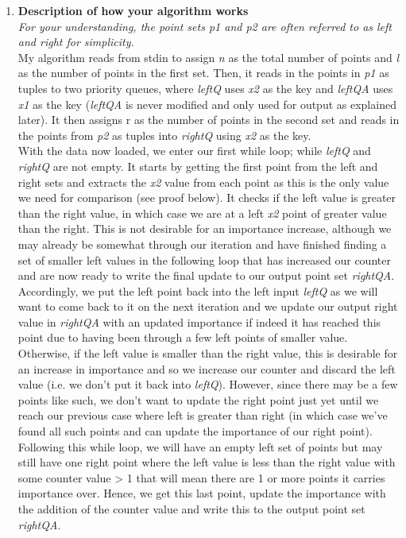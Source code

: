 \documentclass[11pt, oneside]{article}   	%
\begin{document}
\begin{enumerate}
\begin{enumerate}
		\begin{enumerate}
			\item \textbf{Description of how your algorithm works}\\
			\textit{For your understanding, the point sets p1 and p2 are often referred to as left and right for simplicity.}\\
			My algorithm reads from stdin to assign \textit{n} as the total number of points and \textit{l} as the number of points in the first set. Then, it reads in the points in \textit{p1} as tuples to two priority queues, where \textit{leftQ} uses \textit{x2} as the key and \textit{leftQA} uses \textit{x1} as the key (\textit{leftQA} is never modified and only used for output as explained later). It then assigns r as the number of points in the second set and reads in the points from \textit{p2} as tuples into \textit{rightQ} using \textit{x2} as the key.\\
			With the data now loaded, we enter our first while loop; while \textit{leftQ} and \textit{rightQ} are not empty. It starts by getting the first point from the left and right sets and extracts the \textit{x2} value from each point as this is the only value we need for comparison (see proof below). It checks if the left value is greater than the right value, in which case we are at a left \textit{x2} point of greater value than the right. This is not desirable for an importance increase, although we may already be somewhat through our iteration and have finished finding a set of smaller left values in the following loop that has increased our counter and are now ready to write the final update to our output point set \textit{rightQA}. Accordingly, we put the left point back into the left input \textit{leftQ} as we will want to come back to it on the next iteration and we update our output right value in \textit{rightQA} with an updated importance if indeed it has reached this point due to having been through a few left points of smaller value. Otherwise, if the left value is smaller than the right value, this is desirable for an increase in importance and so we increase our counter and discard the left value (i.e. we don't put it back into \textit{leftQ}). However, since there may be a few points like such, we don't want to update the right point just yet until we reach our previous case where left is greater than right (in which case we've found all such points and can update the importance of our right point). Following this while loop, we will have an empty left set of points but may still have one right point where the left value is less than the right value with some counter value > 1 that will mean there are 1 or more points it carries importance over. Hence, we get this last point, update the importance with the addition of the counter value and write this to the output point set \textit{rightQA}.\\

\end{enumerate}
\end{enumerate}
\end{enumerate}
\end{document}
